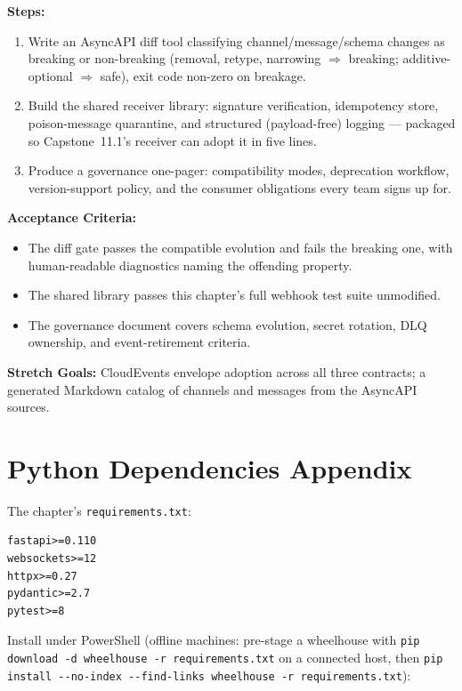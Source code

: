 \textbf{Steps:}
\begin{enumerate}
  \item Write an AsyncAPI diff tool classifying channel/message/schema
        changes as breaking or non-breaking (removal, retype, narrowing
        $\Rightarrow$ breaking; additive-optional $\Rightarrow$ safe), exit
        code non-zero on breakage.
  \item Build the shared receiver library: signature verification,
        idempotency store, poison-message quarantine, and structured
        (payload-free) logging --- packaged so Capstone~11.1's receiver can
        adopt it in five lines.
  \item Produce a governance one-pager: compatibility modes, deprecation
        workflow, version-support policy, and the consumer obligations every
        team signs up for.
\end{enumerate}

\textbf{Acceptance Criteria:}
\begin{itemize}[label=$\square$]
  \item The diff gate passes the compatible evolution and fails the breaking
        one, with human-readable diagnostics naming the offending property.
  \item The shared library passes this chapter's full webhook test suite
        unmodified.
  \item The governance document covers schema evolution, secret rotation,
        DLQ ownership, and event-retirement criteria.
\end{itemize}

\textbf{Stretch Goals:} CloudEvents envelope adoption across all three
contracts; a generated Markdown catalog of channels and messages from the
AsyncAPI sources.

\section{Python Dependencies Appendix}
\label{sec:ch11-deps}

The chapter's \texttt{requirements.txt}:

\begin{verbatim}
fastapi>=0.110
websockets>=12
httpx>=0.27
pydantic>=2.7
pytest>=8
\end{verbatim}

Install under PowerShell (offline machines: pre-stage a wheelhouse with
\texttt{pip download -d wheelhouse -r requirements.txt} on a connected host,
then \texttt{pip install {-}{-}no-index {-}{-}find-links wheelhouse -r
requirements.txt}):

